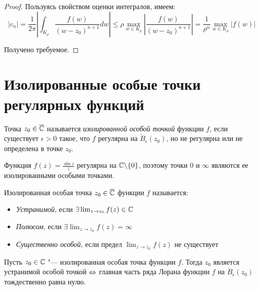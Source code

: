 \begin{proof}
	Пользуясь свойством оценки интегралов, имеем:
	\[|c_n| = \frac1{2\pi}\left|\int_{K_{\rho}} \frac{f(w)}{(w - z_0)^{n+1}}dw\right| \le \rho\max_{w \in K_\rho}\left|\frac{f(w)}{(w - z_0)^{n+1}}\right| = \frac1{\rho^n}\max_{w \in K_{\rho}}\left|{f(w)}\right|\]
	
	Получено требуемое.
\end{proof}

\section{Изолированные особые точки регулярных функций}

\begin{definition}
	Точка $z_0 \in \overline{\mathbb{C}}$ называется \textit{изолированной особой точкой} функции $f$, если существует $\epsilon > 0$ такое, что $f$ регулярна на $\mathring B_\epsilon(z_0)$, но не регулярна или не определена в точке $z_0$.
\end{definition}

\begin{example}
	Функция $f(z) = \frac{\sin{z}}{z}$ регулярна на $\mathbb{C} \backslash \{0\}$, поэтому точки $0$ и $\infty$ являются ее изолированными особыми точками.
\end{example}

\begin{definition}
	Изолированная особая точка $z_0 \in \overline{\mathbb{C}}$ функции $f$ называется:
	\begin{itemize}
		\item \textit{Устранимой}, если $\exists \lim_{z \to z_0} f(z) \in \mathbb{C}$
		\item \textit{Полюсом}, если $\exists \lim_{z \to z_0} f(z) = \infty$
		\item \textit{Существенно особой}, если предел $\lim_{z \to z_0} f(z)$ не существует
	\end{itemize}
\end{definition}

\begin{proposition}
	Пусть $z_0 \in \mathbb{C}$ "--- изолированная особая точка функции $f$. Тогда $z_0$ является устранимой особой точкой $\Leftrightarrow$ главная часть ряда Лорана функции $f$ на $\mathring B_\epsilon(z_0)$ тождественно равна нулю.
\end{proposition}

